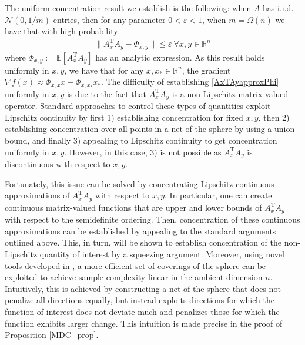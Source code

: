 \documentclass[11pt]{article}
\newcommand{\R}{\mathbb{R}}
\newcommand{\T}{\mathrm{T}}
\renewcommand{\epsilon}{\varepsilon}
\newcommand{\E}{\mathbb{E}}
\begin{document}


The uniform concentration result we establish is the following: when $A$ has i.i.d. $\mathcal{N}(0,1/m)$ entries, then for any parameter $0 < \epsilon < 1$, when $m = \Omega(n)$ we have that with high probability \begin{align}\|A_x^{\T}A_y - \Phi_{x,y}\| \leqslant \epsilon\ \forall x,y \in \R^n \label{AxTAyapproxPhi}\end{align} where $\Phi_{x,y} := \E[A_x^{\T}A_y]$ has an analytic expression. As this result holds uniformly in $x,y$, we have that for any $x,x_* \in \R^n$, the gradient $\nabla f(x) \approx \Phi_{x,x}x - \Phi_{x,x_*}x_*$. The difficulty of establishing \eqref{AxTAyapproxPhi} uniformly in $x,y$ is due to the fact that $A_x^{\T}A_y$ is a non-Lipschitz matrix-valued operator. Standard approaches to control these types of quantities exploit Lipschitz continuity by first 1) establishing concentration for fixed $x,y$, then 2) establishing concentration over all points in a net of the sphere by using a union bound, and finally 3) appealing to Lipschitz continuity to get concentration uniformly in $x,y$. However, in this case, 3) is not possible as $A_x^{\T}A_y$ is discontinuous with respect to $x,y$.

Fortunately, this issue can be solved by concentrating Lipschitz continuous approximations of $A_x^{\T}A_y$ with respect to $x,y$. In particular, one can create continuous matrix-valued functions that are upper and lower bounds of $A_x^{\T}A_y$ with respect to the semidefinite ordering. Then, concentration of these continuous approximations can be established by appealing to the standard arguments outlined above. This, in turn, will be shown to establish concentration of the non-Lipschitz quantity of interest by a squeezing argument. Moreover, using novel tools developed in \cite{Daskalaskisetal2020}, a more efficient set of coverings of the sphere can be exploited to achieve sample complexity linear in the ambient dimension $n$. Intuitively, this is achieved by constructing a net of the sphere that does not penalize all directions equally, but instead exploits directions for which the function of interest does not deviate much and penalizes those for which the function exhibits larger change. This intuition is made precise in the proof of Proposition \ref{MDC_prop}.
\end{document}

